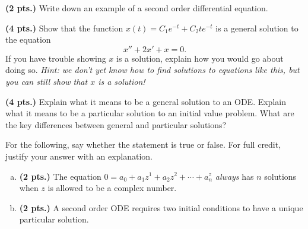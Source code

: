 \documentclass[12pt]{amsbook}
\begin{document}
\begin{problem}
\textbf{(2 pts.)} Write down an example of a second order differential equation.
\end{problem}  


\begin{problem}
\textbf{(4 pts.)} Show that the function $x(t)=C_1 e^{-t}+C_2 t e^{-t}$ is a general solution to the equation
\[
x''+2x'+x=0.
\]
If you have trouble showing $x$ is a solution, explain how you would go about doing so. \emph{Hint: we don't yet know how to find solutions to equations like this, but you can still show that $x$ is a solution!}
\end{problem}

\begin{problem}
    \textbf{(4 pts.)} Explain what it means to be a general solution to an ODE. Explain what it means to be a particular solution to an initial value problem.  What are the key differences between general and particular solutions?
\end{problem}

\begin{problem} For the following, say whether the statement is true or false. For full credit, justify your answer with an explanation.
\begin{enumerate}[(a)]
    \item \textbf{(2 pts.)} The equation $0=a_0 + a_1 z^1 + a_2 z^2 + \cdots + a_n^z$ \emph{always} has $n$ solutions when $z$ is allowed to be a complex number.
    \item \textbf{(2 pts.)} A second order ODE requires two initial conditions to have a unique particular solution.
\end{enumerate}

\end{problem}
\end{document}
